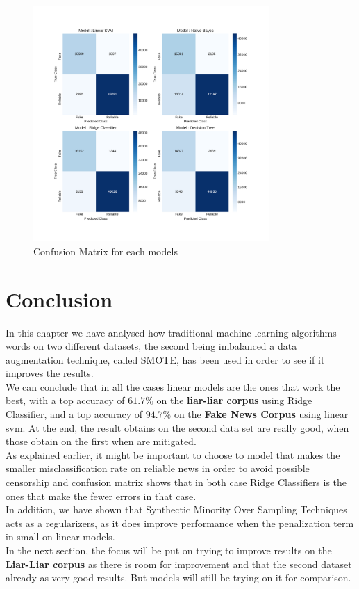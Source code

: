 \begin{figure}
 \centering
 \includegraphics[width=0.8\textwidth]{images/chapitre3/test_SMOTE_fake_confMat}
 \caption{Confusion Matrix for each models}
 \label{fig:chap3:confMat3}
\end{figure}
\section{Conclusion}
In this chapter we have analysed how traditional machine learning algorithms words on two different datasets, the second being imbalanced a data augmentation technique, called SMOTE, has been used in order to see if it improves the results. \\
We can conclude that in all the cases linear models are the ones that work the best, with a top accuracy of $61.7\%$ on the \textbf{liar-liar corpus} using Ridge Classifier, and a top accuracy of $94.7\%$ on the \textbf{Fake News Corpus} using linear svm. At the end, the result obtains on the second data set are really good, when those obtain on the first when are mitigated. \\
As explained earlier, it might be important to choose to model that makes the smaller misclassification rate on reliable news in order to avoid possible censorship and confusion matrix shows that in both case Ridge Classifiers is the ones that make the fewer errors in that case. \\
In addition, we have shown that Synthectic Minority Over Sampling Techniques acts as a regularizers, as it does improve performance when the penalization term in small on linear models. \\
In the next section, the focus will be put on trying to improve results on the \textbf{Liar-Liar corpus} as there is room for improvement and that the second dataset already as very good results. But models will still be trying on it for comparison. 